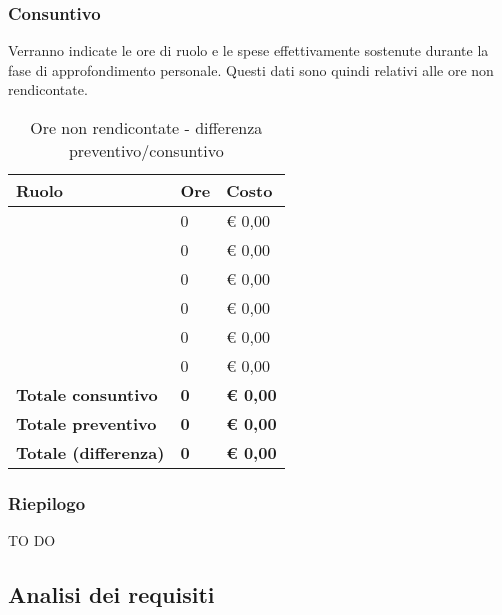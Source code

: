 		\subsubsection{Consuntivo} %
		\label{ssub:consuntivo}
		Verranno indicate le ore di ruolo e le spese effettivamente sostenute durante la fase di approfondimento personale. Questi dati sono quindi relativi alle ore non rendicontate.
		\begin{table}[!h]
			\begin{center}
				\begin{tabularx}{0.65\textwidth}{|l|l|X|}
					\hline
					\textbf{Ruolo} & \textbf{Ore} & \textbf{Costo} \\
					\hline
					\roleProjectManager & 0 & \euro{} 0,00 \\
					\hline
					\roleAnalyst & 0 & \euro{} 0,00 \\
					\hline
					\roleDesigner & 0 & \euro{} 0,00 \\
					\hline
					\roleAdministrator & 0 & \euro{} 0,00 \\
					\hline
					\roleProgrammer & 0 & \euro{} 0,00 \\
					\hline
					\roleVerifier & 0 & \euro{} 0,00 \\
					\hline
					\textbf{Totale consuntivo} & \textbf{0} & \textbf{\euro{} 0,00} \\
					\hline
					\textbf{Totale preventivo} & \textbf{0} & \textbf{\euro{} 0,00} \\
					\hline
					\textbf{Totale (differenza)} & \textbf{0} & \textbf{\euro{} 0,00} \\
					\hline
				\end{tabularx}
			\end{center}
		\caption{Ore non rendicontate - differenza preventivo/consuntivo}
		\end{table}
		
		\subsubsection{Riepilogo} %
		\label{ssub:riepilogo}
		TO DO
		
	\newpage
	\subsection{Analisi dei requisiti} %
	\label{sub:analisi_dei_requisiti}

